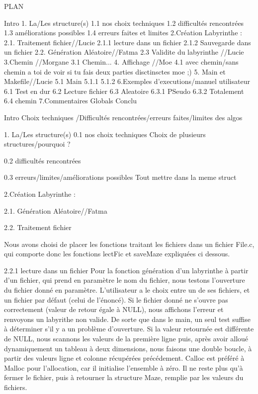 PLAN

Intro
1. La/Les  structure(s)
  1.1 nos choix techniques
  1.2 difficultés rencontrées
  1.3 améliorations possibles
  1.4 erreurs faites et limites
2.Création Labyrinthe :
  2.1. Traitement fichier//Lucie
    2.1.1 lecture dans un fichier
    2.1.2 Sauvegarde dans un fichier
  2.2. Génération Aléatoire//Fatma
  2.3 Validite du labyrinthe //Lucie
3.Chemin //Morgane
  3.1 Chemin...
4. Affichage //Moe
  4.1 avec chemin/sans chemin a toi de voir si tu fais deux parties disctinsctes moe ;)
5. Main et Makefile//Lucie
  5.1 Main
    5.1.1
    5.1.2
6.Exemples d'executions/manuel utilisateur
  6.1 Test en dur
  6.2 Lecture fichier
  6.3 Aleatoire
    6.3.1 PSeudo
    6.3.2 Totalement
  6.4 chemin
7.Commentaires Globals
Conclu






Intro
Choix techniques /Difficultés rencontrées/erreurs faites/limites des algos


1. La/Les  structure(s)
0.1 nos choix techniques
  Choix de plusieurs structures/pourquoi ?
  
0.2 difficultés rencontrées
  
0.3 erreurs/limites/améliorations possibles
Tout mettre dans la meme struct


2.Création Labyrinthe :

2.1. Génération Aléatoire//Fatma

2.2. Traitement fichier

Nous avons choisi de placer les fonctions traitant les fichiers dans un fichier File.c, qui comporte donc les fonctions lectFic et saveMaze expliquées ci dessous.

2.2.1 lecture dans un fichier
Pour la fonction génération d'un labyrinthe à partir d'un fichier, qui prend en paramètre le nom du fichier, nous testons l'ouverture du fichier donné en paramètre. L'utilisateur a le choix entre un de ses fichiers, et un fichier par défaut (celui de l'énoncé). Si le fichier donné ne s'ouvre pas correctement (valeur de retour égale à NULL), nous affichons l'erreur et renvoyons un labyrithe non valide. De sorte que dans le main, un seul test suffise à déterminer s'il y a un problème d'ouverture.
Si la valeur retournée est différente de NULL, nous scannons les valeurs de la première ligne puis, après avoir alloué dynamiquement un tableau à deux dimensions, nous faisons une double boucle, à partir des valeurs ligne et colonne récupérées précédement. Calloc est préféré à Malloc pour l'allocation, car il initialise l'ensemble à zéro. Il ne reste plus qu'à fermer le fichier, puis à retourner la structure Maze, remplie par les valeurs du fichiers.

